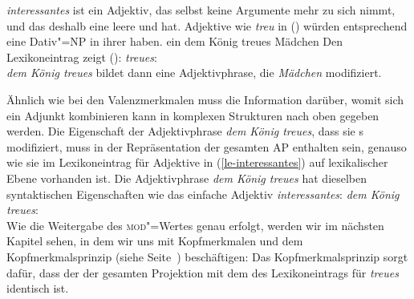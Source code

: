 \z
\emph{interessantes} ist ein Adjektiv, das selbst keine Argumente mehr zu sich nimmt,
und das deshalb eine leere \sprl und \compsl hat. Adjektive wie \emph{treu} in () würden entsprechend
eine Dativ"=NP in ihrer \compsl haben.
\ea
ein dem König treues Mädchen
\z
Den Lexikoneintrag zeigt ():
\ea
\label{le-treue}
\emph{treues}:\\
\z
\emph{dem König treues} bildet dann eine Adjektivphrase, die \emph{Mädchen} modifiziert.

Ähnlich wie bei den Valenzmerkmalen muss die Information darüber, womit sich ein Adjunkt kombinieren
kann in komplexen Strukturen nach oben gegeben werden. Die Eigenschaft der Adjektivphrase \emph{dem
König treues}, dass sie \nbar{}s modifiziert, muss in der Repräsentation der gesamten AP enthalten sein,
genauso wie sie im Lexikoneintrag für Adjektive in (\ref{le-interessantes}) auf lexikalischer Ebene
vorhanden ist. Die Adjektivphrase \emph{dem König treues} hat dieselben syntaktischen Eigenschaften wie das einfache
Adjektiv \emph{interessantes}:
\ea
\label{avm-dem-koenig-treues}
\emph{dem König treues}:\\
\z
Wie die Weitergabe des \textsc{mod}"=Wertes genau erfolgt, werden wir im nächsten Kapitel sehen, in
dem wir uns mit Kopfmerkmalen und dem Kopfmerkmalsprinzip (siehe Seite~\pageref{prinzip-hfp})
beschäftigen: Das Kopfmerkmalsprinzip sorgt dafür, dass der \modw der gesamten Projektion mit dem
\modw des Lexikoneintrags für \emph{treues} identisch ist. 

